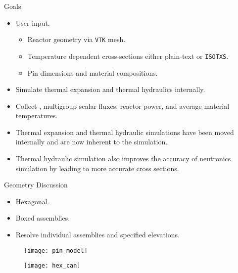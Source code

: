 \begin{frame}{Goals}
  \begin{itemize}
    \item User input.
      \begin{itemize}
        \item Reactor geometry via \texttt{VTK} mesh.
        \item Temperature dependent cross-sections either plain-text or 
          \texttt{ISOTXS}.
        \item Pin dimensions and material compositions.
      \end{itemize}
    \item Simulate thermal expansion and thermal hydraulics internally.
    \item Collect \keff, multigroup scalar fluxes, reactor power, and average
      material temperatures.
  \end{itemize}
  \vspace{0.25in}
  \begin{itemize}
    \item Thermal expansion and thermal hydraulic simulations have been moved
      internally and are now inherent to the simulation.
    \item Thermal hydraulic simulation also improves the accuracy of neutronics
      simulation by leading to more accurate cross sections.
  \end{itemize}
\end{frame}

\begin{frame}{Geometry Discussion}
  \begin{itemize}
    \item Hexagonal.
    \item Boxed assemblies.
    \item Resolve individual assemblies and specified elevations.
  \end{itemize}
\end{frame}

\begin{frame}
  \begin{figure}
    \centering
    \texttt{[image: pin\_model]}
    \label{fig:pin_model}
  \end{figure}
\end{frame}

\begin{frame}
  \begin{figure}
    \centering
    \texttt{[image: hex\_can]}
    \label{fig:hex_can}
  \end{figure}
\end{frame}

